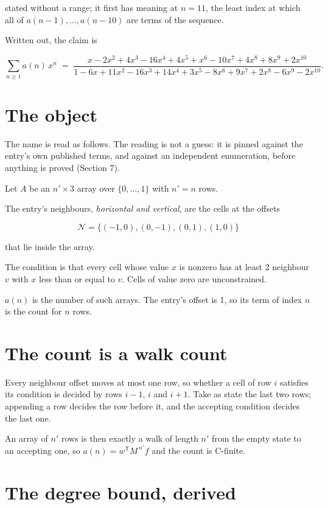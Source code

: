 \documentclass[11pt]{article}
\theoremstyle{definition}
\begin{document}
stated without a range; it first has meaning at $n = 11$, the least index at which all of $a(n-1),\dots,a(n-10)$ are terms of the sequence.

Written out, the claim is

\[\sum_{n \ge 1} a(n)\,x^n \;=\; \frac{x - 2x^{2} + 4x^{3} - 16x^{4} + 4x^{5} + x^{6} - 10x^{7} + 4x^{8} + 8x^{9} + 2x^{10}}{1 - 6x + 11x^{2} - 16x^{3} + 14x^{4} + 3x^{5} - 8x^{6} + 9x^{7} + 2x^{8} - 6x^{9} - 2x^{10}}.\]

\section{The object}

The name is read as follows. The reading is not a guess: it is pinned against the entry's own published terms, and against an independent enumeration, before anything is proved (Section 7).

Let $A$ be an $n' \times 3$ array over $\{0,\dots,1\}$ with $n' = n$ rows.

The entry's neighbours, {\itshape horizontal and vertical}, are the cells at the offsets

\[\mathcal{N} = \{(-1,0), (0,-1), (0,1), (1,0)\}\]

that lie inside the array.

The condition is that every cell whose value $x$ is nonzero has at least 2 neighbour $v$ with $x$ less than or equal to $v$. Cells of value zero are unconstrained.

$a(n)$ is the number of such arrays. The entry's offset is 1, so its term of index $n$ is the count for $n$ rows.

\section{The count is a walk count}

Every neighbour offset moves at most one row, so whether a cell of row $i$ satisfies its condition is decided by rows $i-1$, $i$ and $i+1$. Take as state the last two rows; appending a row decides the row before it, and the accepting condition decides the last one.

An array of $n'$ rows is then exactly a walk of length $n'$ from the empty state to an accepting one, so $a(n) = w^{\mathsf T}M^{\,n'}f$ and the count is C-finite.

\section{The degree bound, derived}
\end{document}
